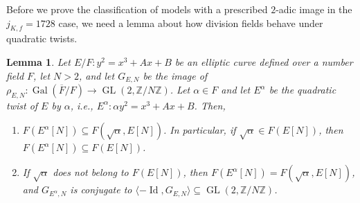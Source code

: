 \documentclass[11pt]{amsart}
\newtheorem{lemma}[defn]{Lemma}
\theoremstyle{definition}
\newcommand{\Z}{\mathbb Z}
\newcommand{\Gal}{\operatorname{Gal}}
\newcommand{\GL}{\operatorname{GL}}
\begin{document}
Before we prove the classification of models with a prescribed $2$-adic image in the $j_{K,f}=1728$ case, we need a lemma about how division fields behave under quadratic twists.

\begin{lemma}\label{lem-twistimage}
    Let $E/F : y^2=x^3+Ax+B$ be an elliptic curve defined over a number field $F$, let $N>2$, and let $G_{E,N}$ be the image of $\rho_{E,N}\colon \Gal(\overline{F}/F)\to \GL(2,\Z/N\Z)$. Let $\alpha \in F$ and let $E^\alpha$ be the quadratic twist of $E$ by $\alpha$, i.e., $E^\alpha : \alpha y^2 = x^3+Ax+B$. Then, 
    \begin{enumerate}
        \item $F(E^\alpha[N])\subseteq F(\sqrt{\alpha},E[N])$. In particular, if $\sqrt{\alpha}\in F(E[N])$, then $F(E^\alpha[N])\subseteq F(E[N])$.
        \item If $\sqrt{\alpha}$ does not belong to $F(E[N])$, then $F(E^\alpha[N])=F(\sqrt{\alpha},E[N])$, and $G_{E^\alpha,N}$ is conjugate to $\langle -\operatorname{Id},G_{E,N}\rangle \subseteq \GL(2,\Z/N\Z)$.
    \end{enumerate}
\end{lemma}
\end{document}
